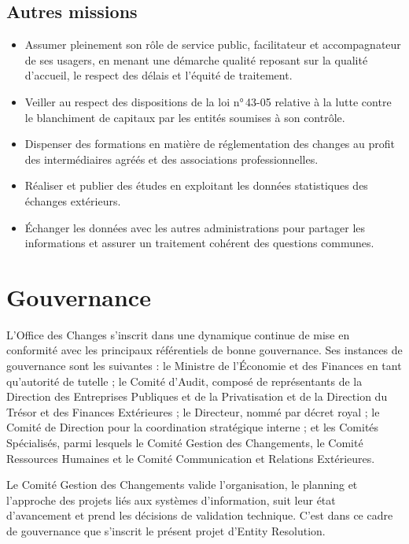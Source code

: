 \subsection{Autres missions}

\begin{itemize}
    \item Assumer pleinement son rôle de service public, facilitateur et accompagnateur de ses usagers, en menant une démarche qualité reposant sur la qualité d'accueil, le respect des délais et l'équité de traitement.
    \item Veiller au respect des dispositions de la loi n°\,43-05 relative à la lutte contre le blanchiment de capitaux par les entités soumises à son contrôle.
    \item Dispenser des formations en matière de réglementation des changes au profit des intermédiaires agréés et des associations professionnelles.
    \item Réaliser et publier des études en exploitant les données statistiques des échanges extérieurs.
    \item Échanger les données avec les autres administrations pour partager les informations et assurer un traitement cohérent des questions communes.
\end{itemize}

\section{Gouvernance}

L'Office des Changes s'inscrit dans une dynamique continue de mise en conformité avec les principaux référentiels de bonne gouvernance. Ses instances de gouvernance sont les suivantes : le Ministre de l'Économie et des Finances en tant qu'autorité de tutelle ; le Comité d'Audit, composé de représentants de la Direction des Entreprises Publiques et de la Privatisation et de la Direction du Trésor et des Finances Extérieures ; le Directeur, nommé par décret royal ; le Comité de Direction pour la coordination stratégique interne ; et les Comités Spécialisés, parmi lesquels le Comité Gestion des Changements, le Comité Ressources Humaines et le Comité Communication et Relations Extérieures.

Le Comité Gestion des Changements valide l'organisation, le planning et l'approche des projets liés aux systèmes d'information, suit leur état d'avancement et prend les décisions de validation technique. C'est dans ce cadre de gouvernance que s'inscrit le présent projet d'Entity Resolution.

